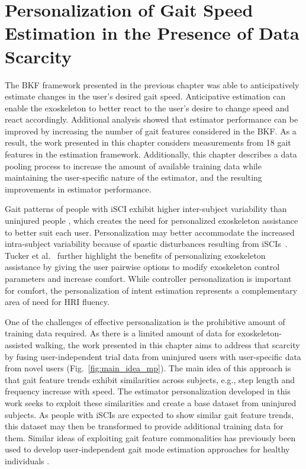 \chapter{Personalization of Gait Speed Estimation in the Presence of Data Scarcity}\label{chapter:MP}

The BKF framework presented in the previous chapter was able to anticipatively estimate changes in the user's desired gait speed. Anticipative estimation can enable the exoskeleton to better react to the user's desire to change speed and react accordingly. Additional analysis showed that estimator performance can be improved by increasing the number of gait features considered in the BKF. As a result, the work presented in this chapter considers measurements from 18 gait features in the estimation framework. Additionally, this chapter describes a data pooling process to increase the amount of available training data while maintaining the user-specific nature of the estimator, and the resulting improvements in estimator performance. 

Gait patterns of people with iSCI exhibit higher inter-subject variability than uninjured people \cite{sohn2018variability}, which creates the need for personalized exoskeleton assistance to better suit each user. Personalization may better accommodate the increased intra-subject variability because of spastic disturbances resulting from iSCIs~\cite{krawetz1996gait}. Tucker et al.~\cite{tucker2020preference} further highlight the benefits of personalizing exoskeleton assistance by giving the user pairwise options to modify exoskeleton control parameters and increase comfort. While controller personalization is important for comfort, the personalization of intent estimation represents a complementary area of need for HRI fluency.

One of the challenges of effective personalization is the prohibitive amount of training data required. As there is a limited amount of data for exoskeleton-assisted walking, the work presented in this chapter aims to address that scarcity by fusing user-independent trial data from uninjured users with user-specific data from novel users (Fig.~\ref{fig:main_idea_mp}).
The main idea of this approach is that gait feature trends exhibit similarities across subjects, e.g., step length and frequency increase with speed. The estimator personalization developed in this work seeks to exploit these similarities and create a base dataset from uninjured subjects. As people with iSCIs are expected to show similar gait feature trends, this dataset may then be transformed to provide additional training data for them. Similar ideas of exploiting gait feature commonalities has previously been used to develop user-independent gait mode estimation approaches for healthy individuals \cite{kilmartin2009optimising,ibrahim2008gait}. 

